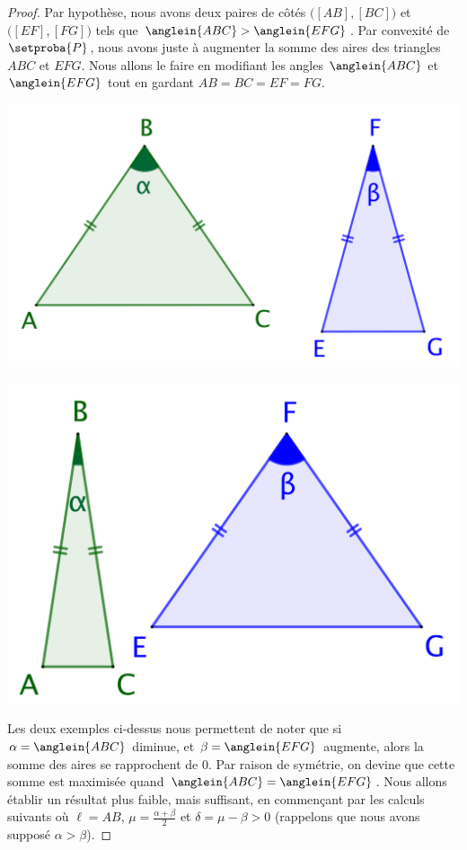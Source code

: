 \begin{proof}
	Par hypothèse, nous avons deux paires de côtés 
	$\big( [AB] , [BC] \big)$ et 
	$\big( [EF] , [FG] \big)$ tels que 
	$\anglein{ABC} > \anglein{EFG}$.
	Par convexité de $\setproba{P}$, nous avons juste à augmenter la somme des aires des triangles $ABC$ et $EFG$.
	Nous allons le faire en modifiant les angles $\anglein{ABC}$ et $\anglein{EFG}$ tout en gardant $AB = BC = EF = FG$.
	\begin{multicols}{2}
		\centering

		\includegraphics[scale=.4]{content/polygon/2-eq-angles-1.png}

		\includegraphics[scale=.4]{content/polygon/2-eq-angles-2.png}
	\end{multicols}

	Les deux exemples ci-dessus nous permettent de noter que si $\alpha = \anglein{ABC}$ diminue, et $\beta = \anglein{EFG}$ augmente, alors la somme des aires se rapprochent de $0$.
	Par raison de symétrie, on devine que cette somme est maximisée quand $\anglein{ABC} = \anglein{EFG}$.
	Nous allons établir un résultat plus faible, mais suffisant, en commençant par les calculs suivants où 
	$\ell = AB$, 
	$\mu = \frac{\alpha + \beta}{2}$ et 
	$\delta = \mu - \beta > 0$ (rappelons que nous avons supposé $\alpha > \beta$). 
	

\end{proof}
